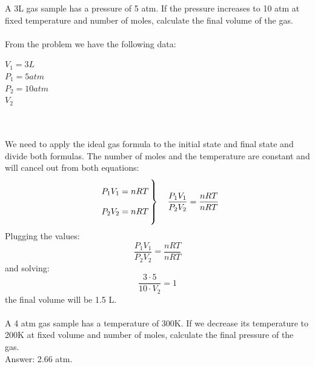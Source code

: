 \documentclass[main.tex]{subfiles}
\begin{document}
\begin{description}
\begin{example} %
A 3L gas sample has a pressure of 5 atm. If the pressure increases to 10 atm at fixed temperature and number of moles, calculate the final volume of the gas. 
\\
\\
From the problem we have the following data:
\begin{tcbitemize}[raster columns=3, raster rows=3, enhanced, sharp corners, raster equal height=rows, raster force size=false, raster column skip=0pt, raster row skip = 0pt]
\tcbitem[blankest, width=1cm]
\tcbitem[header = helpful]
\texta
\tcbitem[header = harmful]
\textb
\tcbitem[firstcol = internal]
\textcn
\tcbitem[swotbox = G]
$V_1=3L$\\
$P_1=5atm$\\
$P_2=10atm$\\
\tcbitem[swotbox = A]
$V_2$\\
\\
\\
\end{tcbitemize}%
We need to apply the ideal gas formula to the initial state and final state and divide both formulas. The number of moles and the temperature are constant and will cancel out from both equations:
\begin{equation}
  \left.
  \raisebox{0pt}[30pt]{\smash{$\begin{array}{r@{}l@{\,}l}
   &  P_1V_1=nRT \\
   \\ 
    & P_2V_2=nRT \\
  \end{array}$}}
  \right\} \quad \frac{P_1V_1}{P_2V_2}=\frac{nRT}{nRT} 
\end{equation}
Plugging the values:
\begin{equation}
\frac{P_1V_1}{P_2V_2}=\frac{nRT}{nRT} 
\end{equation}
and solving:
\begin{equation}
\frac{3\cdot 5}{10\cdot V_2}=1
\end{equation}
the final volume will be 1.5 L.
\\
\faDiamond\ \\
A 4 atm gas sample has a temperature of 300K. If we decrease its temperature to 200K at fixed volume and number of moles, calculate the final pressure of the gas.\\
\flushright Answer: 2.66 atm.
\end{example}%


\end{description}
\end{document}
